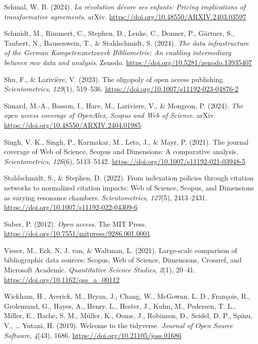 \documentclass[a4paper,man,floatsintext,longtable,noextraspace,10pt]{apa6}
\newlength{\cslhangindent}
\newenvironment{CSLReferences}[2] %
{\begin{list}{}{%
  \setlength{\itemindent}{0pt}
  \setlength{\leftmargin}{0pt}
  \setlength{\parsep}{0pt}
  \ifodd #1
  \setlength{\leftmargin}{\cslhangindent}
  \setlength{\itemindent}{-1\cslhangindent}
  \fi
  \setlength{\itemsep}{#2\baselineskip}}}
{\end{list}}
\begin{document}
\begin{CSLReferences}{1}{0}
Schmal, W. B. (2024). \emph{La révolution dévore ses enfants: Pricing
implications of transformative agreements}. arXiv.
\url{https://doi.org/10.48550/ARXIV.2403.03597}

Schmidt, M., Rimmert, C., Stephen, D., Lenke, C., Donner, P., Gärtner,
S., Taubert, N., Bausenwein, T., \& Stahlschmidt, S. (2024). \emph{The
data infrastructure of the {German Kompetenznetzwerk Bibliometrie}: An
enabling intermediary between raw data and analysis}. Zenodo.
\url{https://doi.org/10.5281/zenodo.13935407}

Shu, F., \& Larivière, V. (2023). The oligopoly of open access
publishing. \emph{Scientometrics}, \emph{129}(1), 519--536.
\url{https://doi.org/10.1007/s11192-023-04876-2}

Simard, M.-A., Basson, I., Hare, M., Lariviere, V., \& Mongeon, P.
(2024). \emph{The open access coverage of {OpenAlex}, {Scopus} and {Web
of Science}}. arXiv. \url{https://doi.org/10.48550/ARXIV.2404.01985}

Singh, V. K., Singh, P., Karmakar, M., Leta, J., \& Mayr, P. (2021). The
journal coverage of {Web of Science}, {Scopus} and {Dimensions}: A
comparative analysis. \emph{Scientometrics}, \emph{126}(6), 5113--5142.
\url{https://doi.org/10.1007/s11192-021-03948-5}

Stahlschmidt, S., \& Stephen, D. (2022). From indexation policies
through citation networks to normalized citation impacts: {Web of
Science}, {Scopus}, and {Dimensions} as varying resonance chambers.
\emph{Scientometrics}, \emph{127}(5), 2413--2431.
\url{https://doi.org/10.1007/s11192-022-04309-6}

Suber, P. (2012). \emph{Open access}. The MIT Press.
\url{https://doi.org/10.7551/mitpress/9286.001.0001}

Visser, M., Eck, N. J. van, \& Waltman, L. (2021). Large-scale
comparison of bibliographic data sources: {Scopus, Web of Science,
Dimensions, Crossref, and Microsoft Academic}. \emph{Quantitative
Science Studies}, \emph{2}(1), 20--41.
\url{https://doi.org/10.1162/qss_a_00112}

Wickham, H., Averick, M., Bryan, J., Chang, W., McGowan, L. D.,
François, R., Grolemund, G., Hayes, A., Henry, L., Hester, J., Kuhn, M.,
Pedersen, T. L., Miller, E., Bache, S. M., Müller, K., Ooms, J.,
Robinson, D., Seidel, D. P., Spinu, V., \ldots{} Yutani, H. (2019).
Welcome to the {tidyverse}. \emph{Journal of Open Source Software},
\emph{4}(43), 1686. \url{https://doi.org/10.21105/joss.01686}


\end{CSLReferences}
\end{document}
